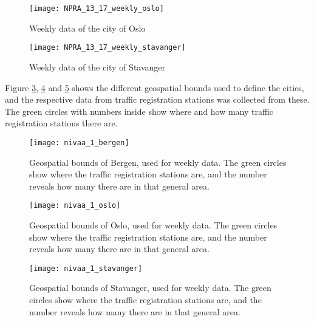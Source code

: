 \begin{figure}[ht]
\texttt{[image: NPRA\_13\_17\_weekly\_oslo]}
\centering
\caption{Weekly data of the city of Oslo}
\label{fig:weeklyoslo}
\end{figure}

\begin{figure}[ht]
\texttt{[image: NPRA\_13\_17\_weekly\_stavanger]}
\centering
\caption{Weekly data of the city of Stavanger}
\label{fig:weeklystavanger}
\end{figure}

Figure \ref{fig:boundsbergen}, \ref{fig:boundsoslo} and \ref{fig:boundsstavanger} shows the different geospatial bounds used to define the cities, and the respective data from traffic registration stations was collected from these. The green circles with numbers inside show where and how many traffic registration stations there are.

\begin{figure}[!htb]
\texttt{[image: nivaa\_1\_bergen]}
\centering
\caption{Geospatial bounds of Bergen, used for weekly data. The green circles show where the traffic registration stations are, and the number reveals how many there are in that general area.}
\label{fig:boundsbergen}
\end{figure}

\begin{figure}[!htb]
\texttt{[image: nivaa\_1\_oslo]}
\centering
\caption{Geospatial bounds of Oslo, used for weekly data. The green circles show where the traffic registration stations are, and the number reveals how many there are in that general area.}
\label{fig:boundsoslo}
\end{figure}

\begin{figure}[!htb]
\texttt{[image: nivaa\_1\_stavanger]}
\centering
\caption{Geospatial bounds of Stavanger, used for weekly data. The green circles show where the traffic registration stations are, and the number reveals how many there are in that general area.}
\label{fig:boundsstavanger}
\end{figure}

